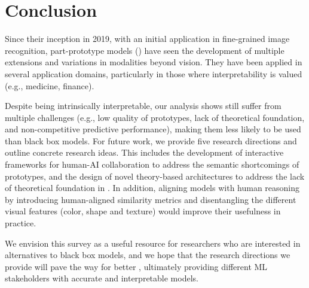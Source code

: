 \section{Conclusion}
\label{sec:conclusion}




Since their inception in 2019, with an initial application in fine-grained image recognition, part-prototype models (\ppms) have seen the development of multiple extensions and variations in modalities beyond vision.
They have been applied in several application domains, particularly in those where interpretability is valued (e.g., medicine, finance).

Despite being intrinsically interpretable, our analysis shows \ppms still suffer from multiple challenges (e.g., low quality of prototypes, lack of theoretical foundation, and non-competitive predictive performance), making them less likely to be used than black box models. 
For future work, we provide five research directions and outline concrete research ideas.
This includes the development of interactive frameworks for human-AI collaboration to address the semantic shortcomings of prototypes, and the design of novel theory-based architectures to address the lack of theoretical foundation in \ppms. 
In addition, aligning models with human reasoning by introducing human-aligned similarity metrics and disentangling the different visual features (color, shape and texture) would improve their usefulness in practice. 

We envision this survey as a useful resource for researchers who are interested in alternatives to black box models, and we hope that the research directions we provide will pave the way for better \ppms, ultimately providing different ML stakeholders with accurate and interpretable models.


